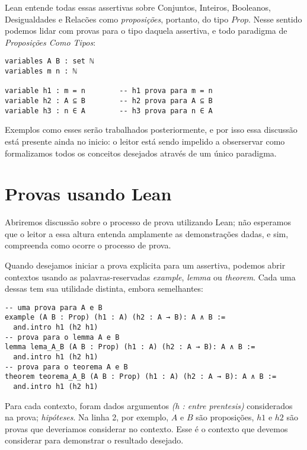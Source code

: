 \noindent Lean entende todas essas assertivas sobre Conjuntos, Inteiros, Booleanos, Desigualdades e Relacões como \textit{proposições}, portanto, do tipo $Prop$.
Nesse sentido podemos lidar com provas para o tipo daquela assertiva, e todo paradigma de \textit{Proposições Como Tipos}:

\vspace{5mm}
\begin{lstlisting}
variables A B : set ℕ
variables m n : ℕ

variable h1 : m = n        -- h1 prova para m = n
variable h2 : A ⊆ B        -- h2 prova para A ⊆ B
variable h3 : n ∈ A        -- h3 prova para n ∈ A
\end{lstlisting}
\vspace{5mm}

Exemplos como esses serão trabalhados posteriormente, e por isso essa discussão está presente ainda no inicio: o leitor está sendo impelido a obserservar como formalizamos todos os conceitos desejados através de um único paradigma.

\section{Provas usando Lean}
Abriremos discussão sobre o processo de prova utilizando Lean; não esperamos que o leitor a essa altura entenda amplamente as demonstrações dadas, e sim, compreenda como ocorre o processo de prova.

Quando desejamos iniciar a prova explicita para um assertiva, podemos abrir contextos usando as palavras-reservadas \textit{example}, \textit{lemma} ou \textit{theorem}. Cada uma dessas tem sua utilidade distinta, embora semelhantes:

\vspace{5mm}
\begin{lstlisting}
-- uma prova para A e B
example (A B : Prop) (h1 : A) (h2 : A → B): A ∧ B :=
  and.intro h1 (h2 h1)
-- prova para o lemma A e B
lemma lema_A_B (A B : Prop) (h1 : A) (h2 : A → B): A ∧ B :=
  and.intro h1 (h2 h1)
-- prova para o teorema A e B
theorem teorema_A_B (A B : Prop) (h1 : A) (h2 : A → B): A ∧ B :=
  and.intro h1 (h2 h1)
\end{lstlisting}
\vspace{5mm}

\noindent Para cada contexto, foram dados argumentos \textit{(h : entre prentesis)} considerados na prova; \textit{hipóteses}. Na linha 2, por exemplo, $A$ e $B$ são proposições, $h1$ e $h2$ são provas que deveriamos considerar no contexto. Esse é o contexto que devemos considerar para demonstrar o resultado desejado.

